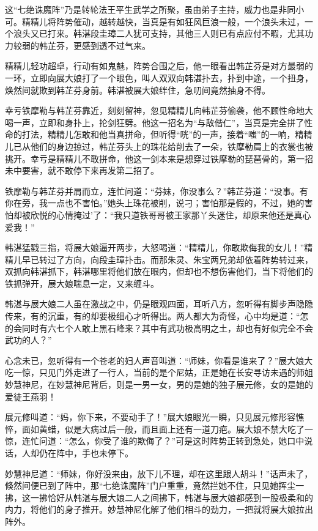 \documentclass[12pt,oneside]{book}
\begin{document}
这``七绝诛魔阵''乃是转轮法王平生武学之所聚，虽由弟子主持，威力也是非同小可。精精儿将阵势催动，越转越快，当真是有如狂风巨浪一般，一个浪头未过，一个浪头又已打来。韩湛段圭璋二人犹可支持，其他三人则已有点应付不暇，尤其功力较弱的韩芷芬，更感到透不过气来。

精精儿轻功超卓，行动有如鬼魅，阵势合围之后，他一眼看出韩芷芬是对方最弱的一环，立即向展大娘打了一个眼色，叫人双双向韩湛扑去，扑到中途，一个扭身，焕然间就欺到韩芷芬身前。韩湛被展大娘绊住，急叨间竟然抽身不得。

幸亏铁摩勒与韩芷芬靠近，刻刻留神，忽见精精儿向韩芷芬偷袭，他不顾性命地大喝一声，立即和身扑上，抡剑狂劈。他这一招名为``与敌偕仁''，当真是完全拼了性命的打法，精精儿怎敢和他当真拼命，但听得``咣''的一声，接着``嗤''的一响，精精儿已从他们的身边掠过，韩芷芬头上的珠花给削去了一朵，铁摩勒肩上的衣裳也被挑开。幸亏是精精儿不敢拼命，他这一剑本来是想穿过铁摩勒的琵琶骨的，第一招未中要害，就不敢停下来再发第二招了。

铁摩勒与韩芷芬并肩而立，连忙问道：``芬妹，你没事么？''韩芷芬道：``没事。有你在旁，我一点也不害怕。''她头上珠花被削，说刁；害怕那是假的，不过，她的害怕却被欣悦的心情掩过'了：``我只道铁哥哥被王家那丫头迷住，却原来他还是真心爱我！''

韩湛猛戳三指，将展大娘逼开两步，大怒喝道：``精精儿，你敢欺侮我的女儿！''精精儿早已转过了方向，向段圭璋扑击。而那朱灵、朱宝两兄弟却依着阵势转过来，双抓向韩湛抓下，韩湛哪里将他们放在眼内，但却也不想伤害他们，当下将他们的铁抓弹开，展大娘喘息一定，又来缠斗。

韩湛与展大娘二人虽在激战之中，仍是眼观四面，耳听八方，忽听得有脚步声隐隐传来，有的沉重，有的却要极细心才听得出。两人都大为奇怪，心中均是道：``怎的会同时有六七个人敢上黑石峰来？其中有武功极高明之土，却也有好似完全不会武功的人？''

心念未已，忽听得有一个苍老的妇人声音叫道：``师妹，你看是谁来了？''展大娘大吃一惊，只见门外走进了一行人，当前的是个尼姑，正是她在长安寻访未遇的师姐妙慧神尼，在妙慧神尼背后，则是一男一女，男的是她的独子展元修，女的是她的爱徒王燕羽！

展元修叫道：``妈，你下来，不要动手了！''展大娘眼光一瞬，只见展元修形容憔悴，面如黄蜡，似是大病过后一般，而且面上还有一道刀疤。展大娘不禁大吃了一惊，连忙问道：``怎么，你受了谁的欺侮了？''可是这时阵势正转到急处，她口中说话，人却仍在阵中，手也未停下。

妙慧神尼道：``师妹，你好没来由，放下儿不理，却在这里跟人胡斗！''话声未了，倏然间便已到了阵中，那``七绝诛魔阵''门户重重，竟然拦她不住，只见她挥尘一拂，这一拂恰好从韩湛与展大娘二人之间拂下，韩湛与展大娘都感到一股极柔和的内力，将他们的身子推开。妙慧神尼化解了他们相斗的劲力，一把就将展大娘拉出阵外。
\end{document}
